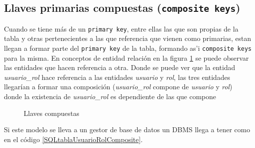 \subsection{Llaves primarias compuestas (\texttt{composite keys})}
Cuando se tiene m\'as de un \texttt{primary key}, entre ellas las que son propias de la tabla y otras pertenecientes a las que referencia que vienen como primarias, estan llegan a formar parte del \texttt{primary key} de la tabla, formando as'i \texttt{composite keys} para la misma. En conceptos de entidad relaci\'on en la figura  \ref{fig:llaves compuestas} se puede observar  las entidades que hacen referencia a otra.
Donde se puede ver que la entidad \textit{usuario\_rol} hace referencia a las entidades \textit{usuario} y \textit{rol}, las tres entidades llegar\'ian a formar una composici\'on  (\textit{usuario\_rol} compone de \textit{usuario} y \textit{rol}) donde la existencia de \textit{usuario\_rol} es dependiente de las que compone
\begin{figure}[H]
\centering
{}
\caption{Llaves compuestas} \label{fig:llaves compuestas}
\end{figure}
Si este modelo se lleva a un gestor de base de datos un DBMS llega a tener como en el c\'odigo \ref{SQLtablaUsuarioRolComposite}.

